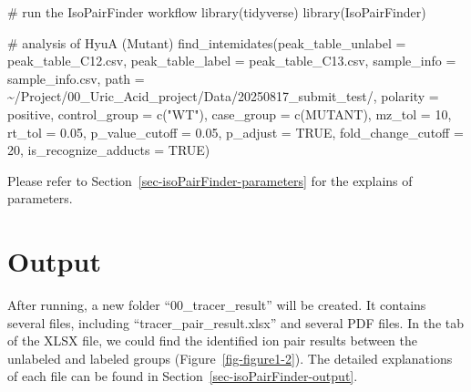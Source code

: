\documentclass[
  letterpaper,
  DIV=11,
  numbers=noendperiod]{scrreprt}
\newenvironment{Shaded}{\begin{snugshade}}{\end{snugshade}}
\newcommand{\AttributeTok}[1]{\textcolor[rgb]{0.40,0.45,0.13}{#1}}
\newcommand{\CommentTok}[1]{\textcolor[rgb]{0.37,0.37,0.37}{#1}}
\newcommand{\ConstantTok}[1]{\textcolor[rgb]{0.56,0.35,0.01}{#1}}
\newcommand{\DecValTok}[1]{\textcolor[rgb]{0.68,0.00,0.00}{#1}}
\newcommand{\FloatTok}[1]{\textcolor[rgb]{0.68,0.00,0.00}{#1}}
\newcommand{\FunctionTok}[1]{\textcolor[rgb]{0.28,0.35,0.67}{#1}}
\newcommand{\NormalTok}[1]{\textcolor[rgb]{0.00,0.23,0.31}{#1}}
\newcommand{\StringTok}[1]{\textcolor[rgb]{0.13,0.47,0.30}{#1}}
\begin{document}
\begin{Shaded}
\begin{Highlighting}[]
\CommentTok{\# run the IsoPairFinder workflow}
\FunctionTok{library}\NormalTok{(tidyverse)}
\FunctionTok{library}\NormalTok{(IsoPairFinder)}

\CommentTok{\# analysis of HyuA (Mutant) }
\FunctionTok{find\_intemidates}\NormalTok{(}\AttributeTok{peak\_table\_unlabel =} \StringTok{\textquotesingle{}peak\_table\_C12.csv\textquotesingle{}}\NormalTok{,}
                 \AttributeTok{peak\_table\_label =} \StringTok{\textquotesingle{}peak\_table\_C13.csv\textquotesingle{}}\NormalTok{,}
                 \AttributeTok{sample\_info =} \StringTok{\textquotesingle{}sample\_info.csv\textquotesingle{}}\NormalTok{,}
                 \AttributeTok{path =} \StringTok{\textquotesingle{}\textasciitilde{}/Project/00\_Uric\_Acid\_project/Data/20250817\_submit\_test/\textquotesingle{}}\NormalTok{,}
                 \AttributeTok{polarity =} \StringTok{\textquotesingle{}positive\textquotesingle{}}\NormalTok{,}
                 \AttributeTok{control\_group =} \FunctionTok{c}\NormalTok{(}\StringTok{"WT"}\NormalTok{),}
                 \AttributeTok{case\_group =} \FunctionTok{c}\NormalTok{(}\StringTok{\textquotesingle{}MUTANT\textquotesingle{}}\NormalTok{),}
                 \AttributeTok{mz\_tol =} \DecValTok{10}\NormalTok{,}
                 \AttributeTok{rt\_tol =} \FloatTok{0.05}\NormalTok{,}
                 \AttributeTok{p\_value\_cutoff =} \FloatTok{0.05}\NormalTok{,}
                 \AttributeTok{p\_adjust =} \ConstantTok{TRUE}\NormalTok{,}
                 \AttributeTok{fold\_change\_cutoff =} \DecValTok{20}\NormalTok{,}
                 \AttributeTok{is\_recognize\_adducts =} \ConstantTok{TRUE}\NormalTok{)}
\end{Highlighting}
\end{Shaded}

Please refer to Section~\ref{sec-isoPairFinder-parameters} for the
explains of parameters.

\section{Output}\label{output}

After running, a new folder ``00\_tracer\_result'' will be created. It
contains several files, including ``tracer\_pair\_result.xlsx'' and
several PDF files. In the tab of the XLSX file, we could find the
identified ion pair results between the unlabeled and labeled groups
(Figure~\ref{fig-figure1-2}). The detailed explanations of each file can
be found in Section~\ref{sec-isoPairFinder-output}.
\end{document}
